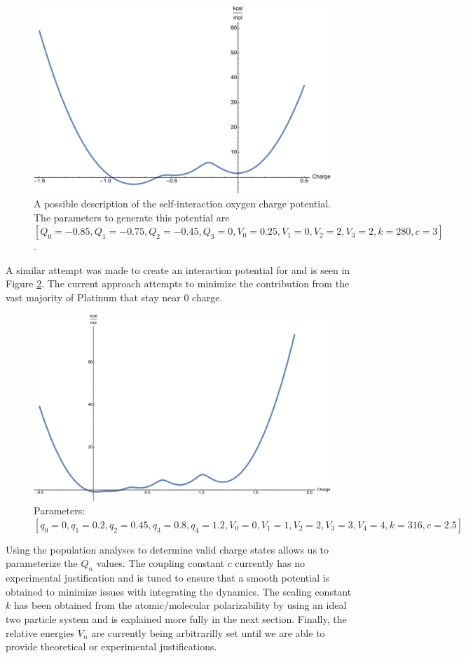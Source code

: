 \begin{figure}
  \centering
  \includegraphics[width=0.75\linewidth]{../figures/chap5/Oxygen_Charge_Testing.pdf}
  \caption{A possible description of the self-interaction oxygen charge
potential. The parameters to generate this potential are $[Q_0 = -0.85, Q_1 =
-0.75, Q_2 = -0.45, Q_3 = 0, V_0 = 0.25, V_1 = 0, V_2 = 2, V_3 = 2, k = 280, c
= 3]$.}
\label{fig:Ocharge}
\end{figure}

A similar attempt was made to create an interaction potential for  and
is seen in Figure \ref{fig:PtCharge}. The current approach attempts to minimize
the contribution from the vast majority of Platinum that stay near $0$ charge.

\begin{figure}
  \centering
  \includegraphics[width=0.75\linewidth]{../figures/chap5/Pt_Charge_Testing.pdf}
  \caption{Parameters: $[q_0 = 0, q_1 = 0.2, q_2 = 0.45, q_3 = 0.8, q_4 = 1.2, V_0 = 0, V_1 = 1, V_2 = 2, V_3 = 3, V_4 = 4, k = 316, c = 2.5]$}
\label{fig:PtCharge}
\end{figure}

Using the population analyses to determine valid charge states allows us to
parameterize the $Q_n$ values. The coupling constant $c$ currently has no
experimental justification and is tuned to ensure that a smooth potential is
obtained to minimize issues with integrating the dynamics. The scaling constant
$k$ has been obtained from the atomic/molecular polarizability by using an
ideal two particle system and is explained more fully in the next section.
Finally, the relative energies $V_n$ are currently being arbitrarilly set until we are able to provide 
theoretical or experimental justifications.



